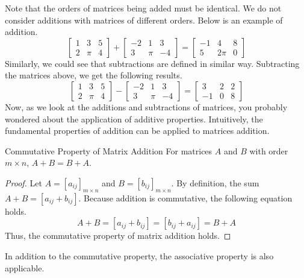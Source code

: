 \documentclass[../main.tex]{subfiles}
\begin{document}
Note that the orders of matrices being added must be identical.
We do not consider additions with matrices of different orders.
Below is an example of addition.
\[
\begin{bmatrix}
    1 & 3   & 5 \\
    2 & \pi & 4
\end{bmatrix}
+
\begin{bmatrix}
    -2 & 1   & 3 \\
    3  & \pi & -4
\end{bmatrix}
=
\begin{bmatrix}
    -1 & 4    & 8 \\
    5  & 2\pi & 0
\end{bmatrix}
\]
Similarly, we could see that subtractions are defined in similar
way. Subtracting the matrices above, we get the following results.
\[
\begin{bmatrix}
    1 & 3   & 5 \\
    2 & \pi & 4
\end{bmatrix}
-
\begin{bmatrix}
    -2 & 1   & 3 \\
    3  & \pi & -4
\end{bmatrix}
=
\begin{bmatrix}
    3  & 2 & 2 \\
    -1 & 0 & 8
\end{bmatrix}
\]
Now, as we look at the additions and subtractions of matrices,
you probably wondered about the application of additive properties.
Intuitively, the fundamental properties of addition can be
applied to matrices addition.

\begin{theorem}{Commutative Property of Matrix Addition}
For matrices $A$ and $B$ with order $m \times n$, $A + B = B + A$.
\end{theorem}
\begin{proof}
Let $A = [a_{ij}]_{m \times n}$ and $B = [b_{ij}]_{m \times n}$.
By definition, the sum $A + B = [a_{ij} + b_{ij}]$. Because
addition is commutative, the following equation holds.
\[
A + B
= [a_{ij} + b_{ij}]
= [b_{ij} + a_{ij}]
= B + A
\]
Thus, the commutative property of matrix addition holds.
\end{proof}

In addition to the commutative property, the associative property
is also applicable.
\end{document}
